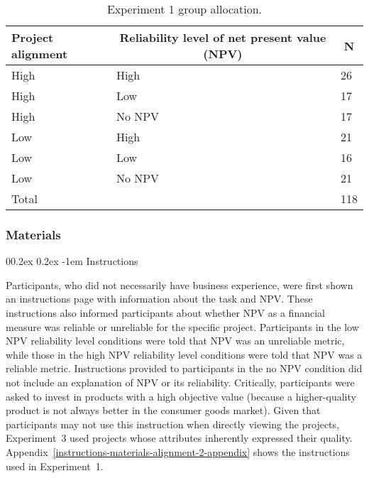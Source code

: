 \documentclass[
  english,
  man, donotrepeattitle,floatsintext]{apa7}
\makeatletter
\let\oldparagraph\paragraph
\renewcommand{\paragraph}[1]{\oldparagraph{#1}\mbox{}}
\renewcommand{\paragraph}{\@startsection{paragraph}{4}{\parindent}%
  {0\baselineskip \@plus 0.2ex \@minus 0.2ex}%
  {-1em}%
  {\normalfont\normalsize\bfseries\itshape\typesectitle}}
\theoremstyle{definition}
\theoremstyle{definition}
\theoremstyle{definition}
\theoremstyle{definition}
\theoremstyle{remark}
\makeatother
\begin{document}
\begin{table}[tbp]

\begin{center}
\begin{threeparttable}

\caption{\label{tab:condition-allocation-alignment-2}Experiment 1 group allocation.}

\begin{tabular}{lll}
\toprule
Project alignment & \multicolumn{1}{c}{Reliability level of net present value (NPV)} & \multicolumn{1}{c}{N}\\
\midrule
High & High & 26\\
High & Low & 17\\
High & No NPV & 17\\
Low & High & 21\\
Low & Low & 16\\
Low & No NPV & 21\\
Total &  & 118\\
\bottomrule
\end{tabular}

\end{threeparttable}
\end{center}

\end{table}

\hypertarget{materials-alignment-2}{%
\subsubsection{Materials}\label{materials-alignment-2}}

\hypertarget{instructions-materials-alignment-2}{%
\paragraph{Instructions}\label{instructions-materials-alignment-2}}

Participants, who did not necessarily have business experience, were first shown
an instructions page with information about the task and NPV. These instructions
also informed participants about whether NPV as a financial measure was reliable
or unreliable for the specific project. Participants in the low NPV reliability
level conditions were told that NPV was an unreliable metric, while those in the
high NPV reliability level conditions were told that NPV was a reliable metric.
Instructions provided to participants in the no NPV condition did not include an
explanation of NPV or its reliability. Critically, participants were asked to
invest in products with a high objective value (because a higher-quality product
is not always better in the consumer goods market). Given that participants may
not use this instruction when directly viewing the projects, Experiment~3 used
projects whose attributes inherently expressed their quality.
Appendix~\ref{instructions-materials-alignment-2-appendix} shows the
instructions used in Experiment~1.
\end{document}
